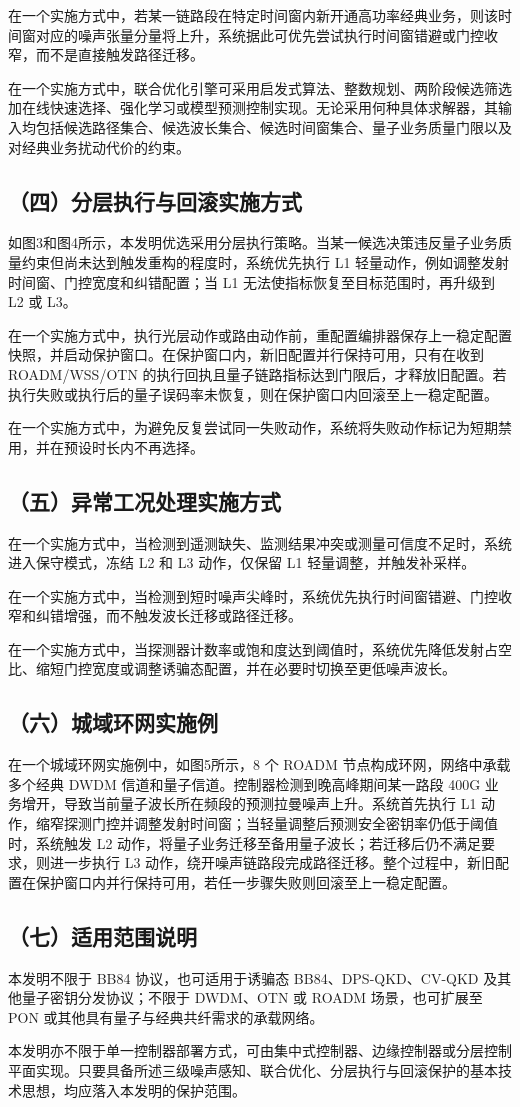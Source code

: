 \documentclass[12pt,a4paper]{article}
\begin{document}
在一个实施方式中，若某一链路段在特定时间窗内新开通高功率经典业务，则该时间窗对应的噪声张量分量将上升，系统据此可优先尝试执行时间窗错避或门控收窄，而不是直接触发路径迁移。

在一个实施方式中，联合优化引擎可采用启发式算法、整数规划、两阶段候选筛选加在线快速选择、强化学习或模型预测控制实现。无论采用何种具体求解器，其输入均包括候选路径集合、候选波长集合、候选时间窗集合、量子业务质量门限以及对经典业务扰动代价的约束。

\subsection*{（四）分层执行与回滚实施方式}

如图3和图4所示，本发明优选采用分层执行策略。当某一候选决策违反量子业务质量约束但尚未达到触发重构的程度时，系统优先执行 L1 轻量动作，例如调整发射时间窗、门控宽度和纠错配置；当 L1 无法使指标恢复至目标范围时，再升级到 L2 或 L3。

在一个实施方式中，执行光层动作或路由动作前，重配置编排器保存上一稳定配置快照，并启动保护窗口。在保护窗口内，新旧配置并行保持可用，只有在收到 ROADM/WSS/OTN 的执行回执且量子链路指标达到门限后，才释放旧配置。若执行失败或执行后的量子误码率未恢复，则在保护窗口内回滚至上一稳定配置。

在一个实施方式中，为避免反复尝试同一失败动作，系统将失败动作标记为短期禁用，并在预设时长内不再选择。

\subsection*{（五）异常工况处理实施方式}

在一个实施方式中，当检测到遥测缺失、监测结果冲突或测量可信度不足时，系统进入保守模式，冻结 L2 和 L3 动作，仅保留 L1 轻量调整，并触发补采样。

在一个实施方式中，当检测到短时噪声尖峰时，系统优先执行时间窗错避、门控收窄和纠错增强，而不触发波长迁移或路径迁移。

在一个实施方式中，当探测器计数率或饱和度达到阈值时，系统优先降低发射占空比、缩短门控宽度或调整诱骗态配置，并在必要时切换至更低噪声波长。

\subsection*{（六）城域环网实施例}

在一个城域环网实施例中，如图5所示，8 个 ROADM 节点构成环网，网络中承载多个经典 DWDM 信道和量子信道。控制器检测到晚高峰期间某一路段 400G 业务增开，导致当前量子波长所在频段的预测拉曼噪声上升。系统首先执行 L1 动作，缩窄探测门控并调整发射时间窗；当轻量调整后预测安全密钥率仍低于阈值时，系统触发 L2 动作，将量子业务迁移至备用量子波长；若迁移后仍不满足要求，则进一步执行 L3 动作，绕开噪声链路段完成路径迁移。整个过程中，新旧配置在保护窗口内并行保持可用，若任一步骤失败则回滚至上一稳定配置。

\subsection*{（七）适用范围说明}

本发明不限于 BB84 协议，也可适用于诱骗态 BB84、DPS-QKD、CV-QKD 及其他量子密钥分发协议；不限于 DWDM、OTN 或 ROADM 场景，也可扩展至 PON 或其他具有量子与经典共纤需求的承载网络。

本发明亦不限于单一控制器部署方式，可由集中式控制器、边缘控制器或分层控制平面实现。只要具备所述三级噪声感知、联合优化、分层执行与回滚保护的基本技术思想，均应落入本发明的保护范围。
\end{document}
